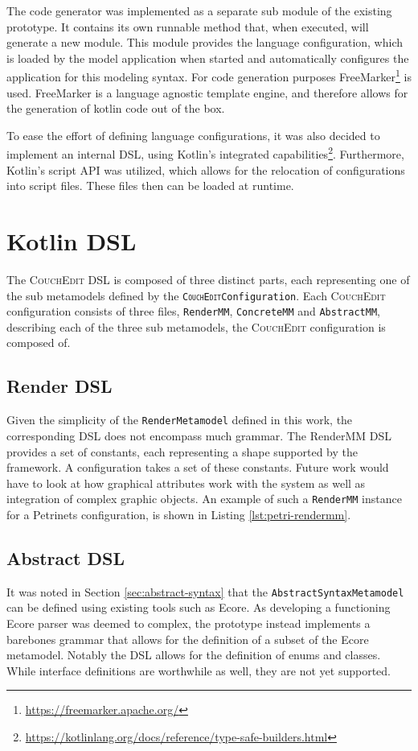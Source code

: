 The code generator was implemented as a separate sub module of the existing prototype. It contains its own runnable method that, when executed, will generate a new module. This module provides the language configuration, which is loaded by the model application when started and automatically configures the application for this modeling syntax. For code generation purposes FreeMarker\footnote{\url{https://freemarker.apache.org/}} is used. FreeMarker is a language agnostic template engine, and therefore allows for the generation of kotlin code out of the box.

To ease the effort of defining language configurations, it was also decided to implement an internal DSL, using Kotlin's integrated capabilities\footnote{\url{https://kotlinlang.org/docs/reference/type-safe-builders.html}}. Furthermore, Kotlin's script API was utilized, which allows for the relocation of configurations into script files. These files then can be loaded at runtime.

\section{Kotlin DSL}
The \textsc{CouchEdit} DSL is composed of three distinct parts, each representing one of the sub metamodels defined by the \texttt{\textsc{CouchEdit}Configuration}. Each \textsc{CouchEdit} configuration consists of three files, \texttt{RenderMM}, \texttt{ConcreteMM} and \texttt{AbstractMM}, describing each of the three sub metamodels, the \textsc{CouchEdit} configuration is composed of.

\subsection{Render DSL}
Given the simplicity of the \texttt{RenderMetamodel} defined in this work, the corresponding DSL does not encompass much grammar. The RenderMM DSL provides a set of constants, each representing a shape supported by the framework. A configuration takes a set of these constants. Future work would have to look at how graphical attributes work with the system as well as integration of complex graphic objects. An example of such a \texttt{RenderMM} instance for a Petrinets configuration, is shown in Listing \ref{lst:petri-rendermm}.

\subsection{Abstract DSL}
It was noted in Section \ref{sec:abstract-syntax} that the \texttt{AbstractSyntaxMetamodel} can be defined using existing tools such as Ecore. As developing a functioning Ecore parser was deemed to complex, the prototype instead implements a barebones grammar that allows for the definition of a subset of the Ecore metamodel. Notably the DSL allows for the definition of enums and classes. While interface definitions are worthwhile as well, they are not yet supported.

